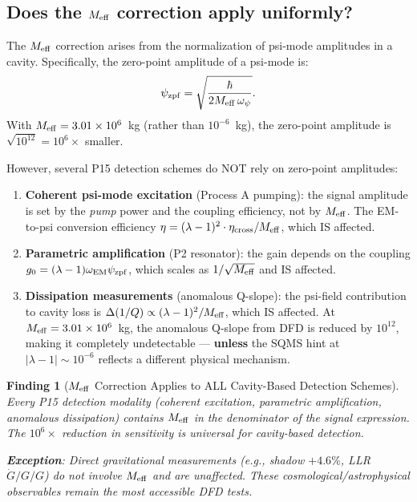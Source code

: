 \documentclass[11pt]{article}
\newtheorem{finding}{Finding}
\newcommand{\ee}[1]{\times 10^{#1}}
\newcommand{\Gdot}{\dot{G}/G}
\newcommand{\lambdaone}{|\lambda-1|}
\newcommand{\Meff}{M_{\rm eff}}
\begin{document}
\subsection{Does the $M_{\rm eff}$ correction apply uniformly?}

The $M_{\rm eff}$ correction arises from the normalization of psi-mode
amplitudes in a cavity. Specifically, the zero-point amplitude of a
psi-mode is:
\begin{equation}
  \psi_{\rm zpf} = \sqrt{\frac{\hbar}{2\Meff\,\omega_\psi}}.
\end{equation}
With $\Meff = 3.01\ee{6}$~kg (rather than $10^{-6}$~kg), the zero-point
amplitude is $\sqrt{10^{12}} = 10^6\times$ smaller.

However, several P15 detection schemes do NOT rely on zero-point
amplitudes:
\begin{enumerate}[label=(\alph*)]
  \item \textbf{Coherent psi-mode excitation} (Process A pumping): the
    signal amplitude is set by the \emph{pump} power and the coupling
    efficiency, not by $\Meff$. The EM-to-psi conversion efficiency
    $\eta = (\lambda-1)^2\cdot\eta_{\rm cross}/\Meff$, which IS affected.
  \item \textbf{Parametric amplification} (P2 resonator): the gain depends
    on the coupling $g_0 = (\lambda-1)\omega_{\rm EM}\psi_{\rm zpf}$, which
    scales as $1/\sqrt{\Meff}$ and IS affected.
  \item \textbf{Dissipation measurements} (anomalous Q-slope): the
    psi-field contribution to cavity loss is $\Delta(1/Q) \propto (\lambda-1)^2
    /\Meff$, which IS affected. At $\Meff = 3.01\ee{6}$~kg, the anomalous
    Q-slope from DFD is reduced by $10^{12}$, making it completely undetectable
    --- \textbf{unless} the SQMS hint at $\lambdaone \sim 10^{-6}$ reflects
    a different physical mechanism.
\end{enumerate}

\begin{finding}[$M_{\rm eff}$ Correction Applies to ALL Cavity-Based Detection Schemes]
\label{find:Meff-universal}
Every P15 detection modality (coherent excitation, parametric amplification,
anomalous dissipation) contains $\Meff$ in the denominator of the signal
expression. The $10^6\times$ reduction in sensitivity is universal for
cavity-based detection.

\textbf{Exception}: Direct gravitational measurements (e.g., shadow $+4.6\%$,
LLR $\Gdot/G$) do not involve $\Meff$ and are unaffected. These
cosmological/astrophysical observables remain the most accessible DFD tests.
\end{finding}
\end{document}
